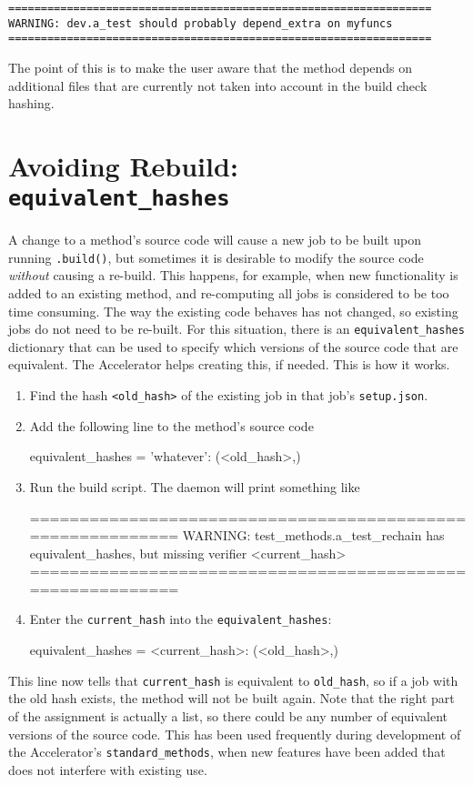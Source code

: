\begin{snugshade}
\begin{verbatim}
=================================================================
WARNING: dev.a_test should probably depend_extra on myfuncs
=================================================================
\end{verbatim}
\end{snugshade}
\noindent The point of this is to make the user aware that the method depends on
additional files that are currently not taken into account in the
build check hashing.



\section{Avoiding Rebuild: \texttt{equivalent\_hashes}}
\label{sec:equivalent_hashes}

A change to a method's source code will cause a new job to be built
upon running \texttt{.build()}, but sometimes it is
desirable to modify the source code \textsl{without} causing a
re-build.  This happens, for example, when new functionality is added
to an existing method, and re-computing all jobs is considered to be
too time consuming.  The way the existing code behaves has not
changed, so existing jobs do not need to be re-built.  For this
situation, there is an \texttt{equivalent\_hashes} dictionary that can
be used to specify which versions of the source code that are
equivalent.  The Accelerator helps creating this, if needed.  This is
how it works.
\begin{enumerate}
\item Find the hash \texttt{<old\_hash>} of the existing job in that
  job's \texttt{setup.json}.
\item Add the following line to the method's source code
\begin{python}
equivalent_hashes = {'whatever': (<old_hash>,)}
\end{python}
\item Run the build script.  The daemon will print something like
\begin{shell}
===========================================================
WARNING: test_methods.a_test_rechain has equivalent_hashes,
but missing verifier <current_hash>
===========================================================
\end{shell}
\item Enter the \texttt{current\_hash} into the
  \texttt{equivalent\_hashes}:
\begin{python}
equivalent_hashes = {<current_hash>: (<old_hash>,)}
\end{python}
\end{enumerate}
This line now tells that \texttt{current\_hash} is equivalent to
\texttt{old\_hash}, so if a job with the old hash exists, the method
will not be built again.  Note that the right part of the assignment
is actually a list, so there could be any number of equivalent
versions of the source code.  This has been used frequently during
development of the Accelerator's \texttt{standard\_methods}, when new
features have been added that does not interfere with existing use.



